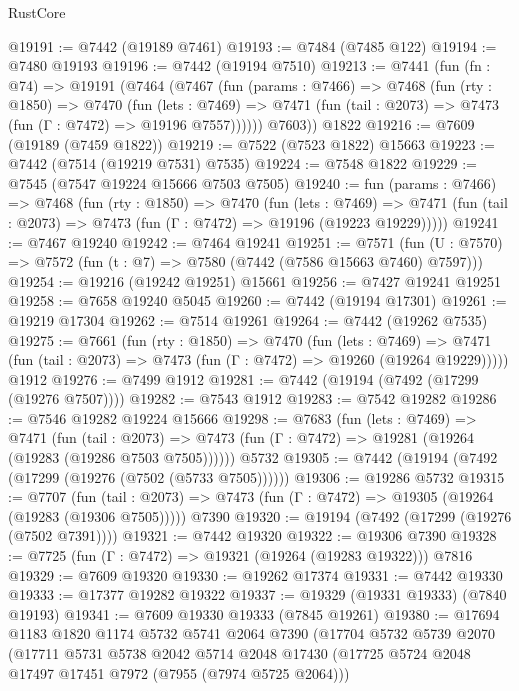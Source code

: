 \begin{lexlean}{RustCore}
\begin{coremodule}
@19191 := @7442 (@19189 @7461)
@19193 := @7484 (@7485 @122)
@19194 := @7480 @19193
@19196 := @7442 (@19194 @7510)
@19213 := @7441
    (fun (fn : @74) =>
    @19191
      (@7464
        (@7467
          (fun (params : @7466) =>
          @7468
            (fun (rty : @1850) =>
            @7470
              (fun (lets : @7469) =>
              @7471 (fun (tail : @2073) => @7473 (fun (Γ : @7472) => @19196 @7557))))))
        @7603))
    @1822
@19216 := @7609 (@19189 (@7459 @1822))
@19219 := @7522 (@7523 @1822) @15663
@19223 := @7442 (@7514 (@19219 @7531) @7535)
@19224 := @7548 @1822
@19229 := @7545 (@7547 @19224 @15666 @7503 @7505)
@19240 := fun (params : @7466) =>
  @7468
    (fun (rty : @1850) =>
    @7470
      (fun (lets : @7469) =>
      @7471 (fun (tail : @2073) => @7473 (fun (Γ : @7472) => @19196 (@19223 @19229)))))
@19241 := @7467 @19240
@19242 := @7464 @19241
@19251 := @7571
    (fun (U : @7570) => @7572 (fun (t : @7) => @7580 (@7442 (@7586 @15663 @7460) @7597)))
@19254 := @19216 (@19242 @19251) @15661
@19256 := @7427 @19241 @19251
@19258 := @7658 @19240 @5045
@19260 := @7442 (@19194 @17301)
@19261 := @19219 @17304
@19262 := @7514 @19261
@19264 := @7442 (@19262 @7535)
@19275 := @7661
    (fun (rty : @1850) =>
    @7470
      (fun (lets : @7469) =>
      @7471 (fun (tail : @2073) => @7473 (fun (Γ : @7472) => @19260 (@19264 @19229)))))
    @1912
@19276 := @7499 @1912
@19281 := @7442 (@19194 (@7492 (@17299 (@19276 @7507))))
@19282 := @7543 @1912
@19283 := @7542 @19282
@19286 := @7546 @19282 @19224 @15666
@19298 := @7683
    (fun (lets : @7469) =>
    @7471
      (fun (tail : @2073) =>
      @7473 (fun (Γ : @7472) => @19281 (@19264 (@19283 (@19286 @7503 @7505))))))
    @5732
@19305 := @7442 (@19194 (@7492 (@17299 (@19276 (@7502 (@5733 @7505))))))
@19306 := @19286 @5732
@19315 := @7707
    (fun (tail : @2073) => @7473 (fun (Γ : @7472) => @19305 (@19264 (@19283 (@19306 @7505)))))
    @7390
@19320 := @19194 (@7492 (@17299 (@19276 (@7502 @7391))))
@19321 := @7442 @19320
@19322 := @19306 @7390
@19328 := @7725 (fun (Γ : @7472) => @19321 (@19264 (@19283 @19322))) @7816
@19329 := @7609 @19320
@19330 := @19262 @17374
@19331 := @7442 @19330
@19333 := @17377 @19282 @19322
@19337 := @19329 (@19331 @19333) (@7840 @19193)
@19341 := @7609 @19330 @19333 (@7845 @19261)
@19380 := @17694
    @1183
    @1820
    @1174
    @5732
    @5741
    @2064
    @7390
    (@17704
      @5732
      @5739
      @2070
      (@17711
        @5731
        @5738
        @2042
        @5714
        @2048
        @17430
        (@17725 @5724 @2048 @17497 @17451 @7972 (@7955 (@7974 @5725 @2064)))

\end{coremodule}
\end{lexlean}
